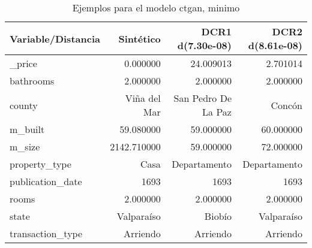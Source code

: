 \begin{table}[H]
\centering
\fontsize{10}{14}\selectfont
\caption{Ejemplos para el modelo ctgan, minimo}
\label{table-example-economicos-a-1-ctgan-min}
\begin{tabular}{|l|r|r|r|}
\hline
\rowcolor[gray]{0.8}
Variable/Distancia & Sintético & DCR1 d(7.30e-08) & DCR2 d(8.61e-08) \\
\hline \_price & \cellcolor[rgb]{0.9, 0.54, 0.52} 0.000000 & 24.009013 & 2.701014 \\
\hline bathrooms & \cellcolor[rgb]{0.9, 0.54, 0.52} 2.000000 & \cellcolor[rgb]{0.9, 0.54, 0.52} 2.000000 & \cellcolor[rgb]{0.9, 0.54, 0.52} 2.000000 \\
\hline county & \cellcolor[rgb]{0.9, 0.54, 0.52} Viña del Mar & San Pedro De La Paz & Concón \\
\hline m\_built & \cellcolor[rgb]{0.9, 0.54, 0.52} 59.080000 & 59.000000 & 60.000000 \\
\hline m\_size & \cellcolor[rgb]{0.9, 0.54, 0.52} 2142.710000 & 59.000000 & 72.000000 \\
\hline property\_type & \cellcolor[rgb]{0.9, 0.54, 0.52} Casa & Departamento & Departamento \\
\hline publication\_date & \cellcolor[rgb]{0.9, 0.54, 0.52} 1693 & \cellcolor[rgb]{0.9, 0.54, 0.52} 1693 & \cellcolor[rgb]{0.9, 0.54, 0.52} 1693 \\
\hline rooms & \cellcolor[rgb]{0.9, 0.54, 0.52} 2.000000 & \cellcolor[rgb]{0.9, 0.54, 0.52} 2.000000 & \cellcolor[rgb]{0.9, 0.54, 0.52} 2.000000 \\
\hline state & \cellcolor[rgb]{0.9, 0.54, 0.52} Valparaíso & Biobío & \cellcolor[rgb]{0.9, 0.54, 0.52} Valparaíso \\
\hline transaction\_type & \cellcolor[rgb]{0.9, 0.54, 0.52} Arriendo & \cellcolor[rgb]{0.9, 0.54, 0.52} Arriendo & \cellcolor[rgb]{0.9, 0.54, 0.52} Arriendo \\
\hline
\end{tabular}
\end{table}

